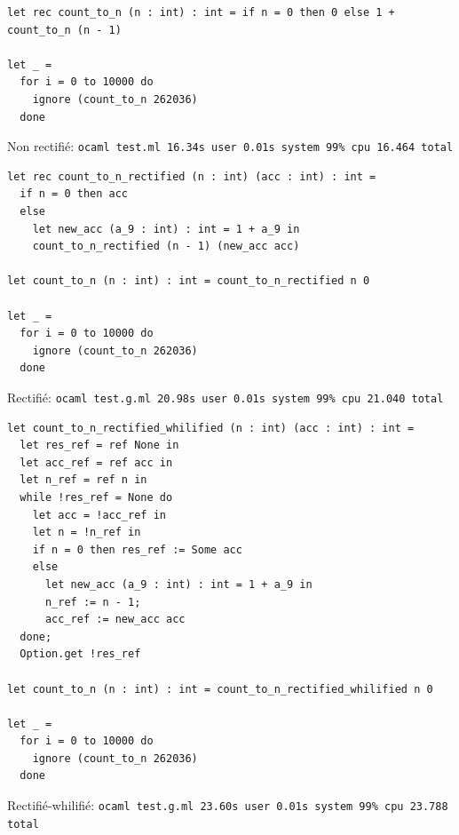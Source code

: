 \pagebreak

\begin{verbatim}
let rec count_to_n (n : int) : int = if n = 0 then 0 else 1 + count_to_n (n - 1)

let _ =
  for i = 0 to 10000 do
    ignore (count_to_n 262036)
  done
\end{verbatim}

Non rectifié: \texttt{ocaml test.ml  16.34s user 0.01s system 99\% cpu 16.464 total}

\begin{verbatim}
let rec count_to_n_rectified (n : int) (acc : int) : int =
  if n = 0 then acc
  else
    let new_acc (a_9 : int) : int = 1 + a_9 in
    count_to_n_rectified (n - 1) (new_acc acc)

let count_to_n (n : int) : int = count_to_n_rectified n 0

let _ =
  for i = 0 to 10000 do
    ignore (count_to_n 262036)
  done
\end{verbatim}

Rectifié: \texttt{ocaml test.g.ml  20.98s user 0.01s system 99\% cpu 21.040 total}

\begin{verbatim}
let count_to_n_rectified_whilified (n : int) (acc : int) : int =
  let res_ref = ref None in
  let acc_ref = ref acc in
  let n_ref = ref n in
  while !res_ref = None do
    let acc = !acc_ref in
    let n = !n_ref in
    if n = 0 then res_ref := Some acc
    else
      let new_acc (a_9 : int) : int = 1 + a_9 in
      n_ref := n - 1;
      acc_ref := new_acc acc
  done;
  Option.get !res_ref

let count_to_n (n : int) : int = count_to_n_rectified_whilified n 0

let _ =
  for i = 0 to 10000 do
    ignore (count_to_n 262036)
  done
\end{verbatim}

Rectifié-whilifié: \texttt{ocaml test.g.ml  23.60s user 0.01s system 99\% cpu 23.788 total}
